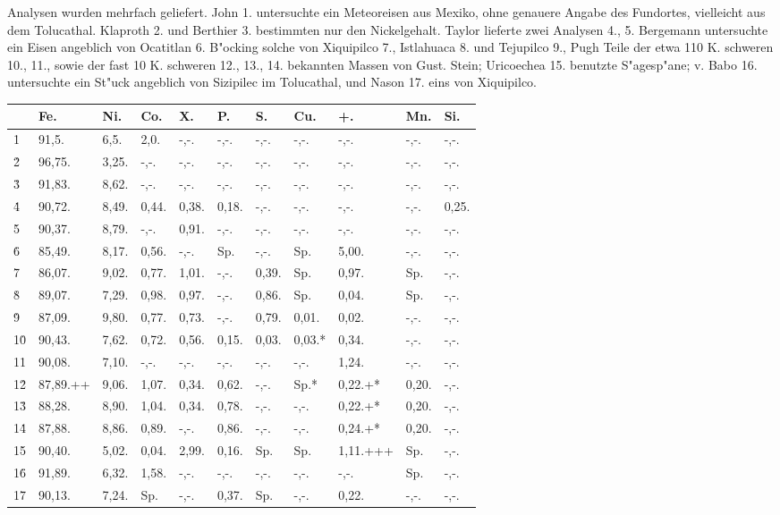 \documentclass[a4paper, 11pt, oneside]{article}
\begin{document}
Analysen wurden mehrfach geliefert. John 1. untersuchte ein Meteoreisen aus Mexiko, ohne genauere Angabe des Fundortes, vielleicht aus dem Tolucathal. Klaproth 2. und Berthier 3. bestimmten nur den Nickelgehalt. Taylor lieferte zwei Analysen 4., 5. Bergemann untersuchte ein Eisen angeblich von Ocatitlan 6. B"ocking solche von Xiquipilco 7., Istlahuaca 8. und Tejupilco 9., Pugh Teile der etwa 110 K. schweren 10., 11., sowie der fast 10 K. schweren 12., 13., 14. bekannten Massen von Gust. Stein; Uricoechea 15. benutzte S"agesp"ane; v. Babo 16. untersuchte ein St"uck angeblich von Sizipilec im Tolucathal, und Nason 17. eins von Xiquipilco.
\begin{table}[H]
    \centering
    \footnotesize
    \begin{tabular}{l l l l l l l l l l l}
         & Fe. & Ni. & Co. & X. & P. & S. & Cu. & +. & Mn. & Si. \\ \hline
        1\. & 91,5. & 6,5. & 2,0. & -,-. & -,-. & -,-. & -,-. & -,-. & -,-. & -,-. \\
        2\. & 96,75. & 3,25. & -,-. & -,-. & -,-. & -,-. & -,-. & -,-. & -,-. & -,-. \\
        3\. & 91,83. & 8,62. & -,-. & -,-. & -,-. & -,-. & -,-. & -,-. & -,-. & -,-. \\
        4\. & 90,72. & 8,49. & 0,44. & 0,38. & 0,18. & -,-. & -,-. & -,-. & -,-. & 0,25. \\
        5\. & 90,37. & 8,79. & -,-. & 0,91. & -,-. & -,-. & -,-. & -,-. & -,-. & -,-. \\
        6\. & 85,49. & 8,17. & 0,56. & -,-. & Sp. & -,-. & Sp. & 5,00. & -,-. & -,-. \\
        7\. & 86,07. & 9,02. & 0,77. & 1,01. & -,-. & 0,39. & Sp. & 0,97. & Sp. & -,-. \\
        8\. & 89,07. & 7,29. & 0,98. & 0,97. & -,-. & 0,86. & Sp. & 0,04. & Sp. & -,-. \\
        9\. & 87,09. & 9,80. & 0,77. & 0,73. & -,-. & 0,79. & 0,01. & 0,02. & -,-. & -,-. \\
        10\. & 90,43. & 7,62. & 0,72. & 0,56. & 0,15. & 0,03. & 0,03.* & 0,34. & -,-. & -,-. \\
        11\. & 90,08. & 7,10. & -,-. & -,-. & -,-. & -,-. & -,-. & 1,24. & -,-. & -,-. \\
        12\. & 87,89.++ & 9,06. & 1,07. & 0,34. & 0,62. & -,-. & Sp.* & 0,22.+* & 0,20. & -,-. \\
        13\. & 88,28. & 8,90. & 1,04. & 0,34. & 0,78. & -,-. & -,-. & 0,22.+* & 0,20. & -,-. \\
        14\. & 87,88. & 8,86. & 0,89. & -,-. & 0,86. & -,-. & -,-. & 0,24.+* & 0,20. & -,-. \\
        15\. & 90,40. & 5,02. & 0,04. & 2,99. & 0,16. & Sp. & Sp. & 1,11.+++ & Sp. & -,-. \\
        16\. & 91,89. & 6,32. & 1,58. & -,-. & -,-. & -,-. & -,-. & -,-. & Sp. & -,-. \\
        17\. & 90,13. & 7,24. & Sp. & -,-. & 0,37. & Sp. & -,-. & 0,22. & -,-. & -,-. \\
    \end{tabular}
\end{table}
\end{document}

